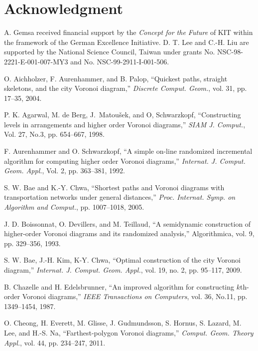 \documentclass[11pt]{llncs}
\begin{document}
\section*{Acknowledgment}
A. Gemsa received financial support by the \emph{Concept for the Future} of KIT within the
framework of the German Excellence Initiative. D. T. Lee and C.-H. Liu are supported by the National Science Council, Taiwan under grants No. NSC-98-2221-E-001-007-MY3 and No. NSC-99-2911-I-001-506.




\begin{thebibliography}{7}

O. Aichholzer, F. Aurenhammer, and B. Palop,
``Quickest paths, straight skeletons, and the city Voronoi diagram,''
\emph{Discrete Comput. Geom.},
vol. 31, pp. 17--35, 2004.

P. K. Agarwal, M. de Berg, J.~Matou{\v s}ek, and O, Schwarzkopf, ``Constructing levels in arrangements and higher order Voronoi diagrams,'' \emph{SIAM J. Comput.}, Vol. 27, No.3, pp. 654--667, 1998.

F. Aurenhammer and O. Schwarzkopf, ``A simple on-line randomized incremental algorithm for computing higher order Voronoi diagrams,''
\emph{Internat. J. Comput. Geom. Appl.}, Vol. 2, pp. 363--381, 1992.

S. W. Bae and K.-Y. Chwa,
``Shortest paths and Voronoi diagrams with transportation networks under general distances,''
 \emph{Proc. Internat. Symp. on Algorithm and Comput.},
 pp. 1007--1018, 2005.

J. D. Boissonnat, O. Devillers, and M. Teillaud, ``A semidynamic construction of higher-order Voronoi diagrams and its randomized analysis,'' Algorithmica, vol. 9, pp. 329--356, 1993.

S. W. Bae, J.-H. Kim, K-Y. Chwa,
``Optimal construction of the city Voronoi diagram,''
\emph{Internat. J. Comput. Geom. Appl.},
vol. 19, no. 2, pp. 95--117, 2009.

B. Chazelle and H. Edelsbrunner, ``An improved algorithm for constructing $k$th-order Voronoi diagrams,''
\emph{IEEE Transactions on Computers}, vol. 36, No.11, pp. 1349--1454, 1987.

O. Cheong, H. Everett, M. Glisse, J. Gudmundsson,
S. Hornus, S. Lazard, M. Lee, and H.-S. Na,
``Farthest-polygon Voronoi diagrams,''
\emph{Comput. Geom. Theory Appl.},
vol. 44, pp. 234--247, 2011.



\end{thebibliography}
\end{document}
